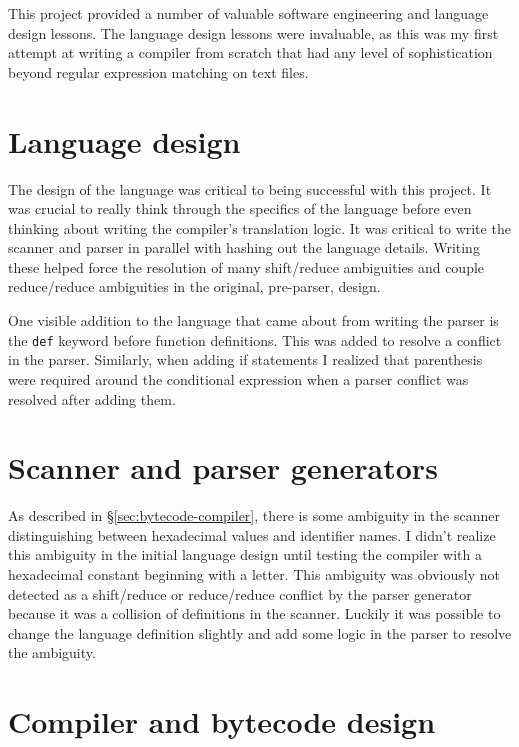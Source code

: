 This project provided a number of valuable software engineering and language design lessons.  The language design lessons were invaluable, as this was my first attempt at writing a compiler from scratch that had any level of sophistication beyond regular expression matching on text files.

\section{Language design}
The design of the language was critical to being successful with this project.  It was crucial to really think through the specifics of the language before even thinking about writing the compiler's translation logic.  It was critical to write the scanner and parser in parallel with hashing out the language details.  Writing these helped force the resolution of many shift/reduce ambiguities and couple reduce/reduce ambiguities in the original, pre-parser, design.

One visible addition to the language that came about from writing the parser is the \texttt{def} keyword before function definitions.  This was added to resolve a conflict in the parser.  Similarly, when adding if statements I realized that parenthesis were required around the conditional expression when a parser conflict was resolved after adding them.

\section{Scanner and parser generators}
As described in \S\ref{sec:bytecode-compiler}, there is some ambiguity in the scanner distinguishing between hexadecimal values and identifier names.  I didn't realize this ambiguity in the initial language design until testing the compiler with a hexadecimal constant beginning with a letter.  This ambiguity was obviously not detected as a shift/reduce or reduce/reduce conflict by the parser generator because it was a collision of definitions in the scanner.  Luckily it was possible to change the language definition slightly and add some logic in the parser to resolve the ambiguity.

\section{Compiler and bytecode design}

